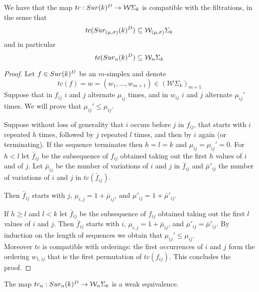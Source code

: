 \begin{lemma}[Compatibility of $tc$]
	We have that the map $tc:Sur(k)^{D}\rightarrow \mathcal{W}\Sigma_{k}$ is compatible with the filtrations, in the sense that
	$$tc(Sur_{(\mu,\sigma)}(k)^{D})\subseteq \mathcal{W}_{(\mu,\sigma)}\Sigma_{k}$$
	and in particular
	$$tc(Sur_{n}(k)^{D})\subseteq \mathcal{W}_{n}\Sigma_{k}$$
\end{lemma}

\begin{proof}
	Let  $f\in Sur(k)^{D}$ be an $m$-simplex and denote
	$$tc(f)=w=(w_{1},\dots,w_{m+1})\in (\mathcal{W}\Sigma_{k})_{m+1}$$
	Suppose that in $f_{ij}$ $i$ and $j$ alternate $\mu_{ij}$ times, and in $w_{ij}$ $i$ and $j$ alternate  $\mu_{ij}'$ times.
	We will prove that
	$\mu_{ij}' \leq \mu_{ij}$.

	Suppose without loss of generality that $i$ occurs before $j$ in $f_{ij}$, that starts with $i$ repeated $h$ times, followed by $j$ repeated $l$ times, and
	then by $i$ again (or terminating).
	If the sequence terminates then $h=l=k$ and $\mu_{ij}=\mu_{ij}'=0$.
	For $h <l$
	let $\bar{f}_{ij}$ be the subsequence of $f_{ij}$
	obtained taking out the first $h$ values of $i$ and of $j$.
	Let $\bar{\mu}_{ij}$ be the number of variations of $i$ and $j$ in $\bar{f}_{ij}$
	and $\bar{\mu}'_{ij}$ the number of variations of $i$ and $j$ in $tc(\bar{f}_{ij})$.

	Then $\bar{f}_{ij}$
	starts with $j$,
	$\mu_{i,j}=1+\bar{\mu}_{ij}$,
	and $\mu'_{ij}=1+\bar{\mu}'_{ij}$.

	If $h \geq l$ and $l<k$
	let $\bar{f}_{ij}$ be the subsequence of $f_{ij}$ obtained taking out the first $l$ values of $i$ and $j$.
	Then $\bar{f}_{ij}$
	starts with $i$,
	$\mu_{i,j}=1+\bar{\mu}_{ij}$,
	and $\mu'_{ij}=\bar{\mu}'_{ij}$.
	By induction on the length of sequences we obtain that
	$\mu_{ij}'\le \mu_{ij}$.\\
	Moreover $tc$ is compatible with orderings: the first occurrences of $i$ and $j$ form the ordering $w_{1,ij}$ that is the first permutation of $tc(f_{ij})$.
	This concludes the proof.
\end{proof}

\begin{corollary} \label{cor-comparing}
	The map $tc_{n}:Sur_{n}(k)^{D}\rightarrow \mathcal{W}_{n}\Sigma_{k}$ is a weak equivalence.
\end{corollary}

